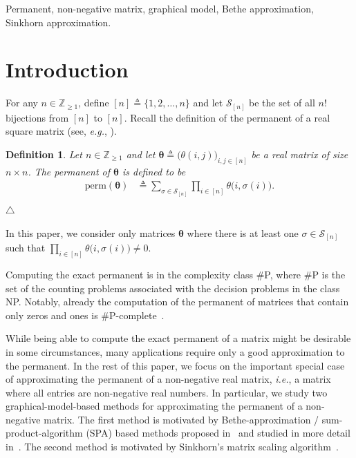 \documentclass[journal,lettersize,twocolumn]{IEEEtran} %
\newtheorem{definition}[theorem]{Definition}
\newcommand{\edefinition}{\hfill$\triangle$}
\newcommand{\set}[1]{\mathcal{#1}}
\newcommand{\sZpp}{\mathbb{Z}_{\geq 1}}
\newcommand{\matr}[1]{ \bm{#1} }
\newcommand{\defeq}{ \triangleq }
\newcommand{\perm}{ \mathrm{perm} }
\newcommand{\setS}{\set{S}}
\newcommand{\mtheta}{\matr{\theta}}
\newcommand{\eg}{\textit{e.g.}}
\newcommand{\ie}{\textit{i.e.}}
\begin{document}
%
%

\begin{IEEEkeywords}
  Permanent,
  non-negative matrix,
  graphical model,
  Bethe approximation,
  Sinkhorn approximation.
\end{IEEEkeywords}

%
%

\section{Introduction}
\label{sec:introduction:1}

%
%

For any $n \in \sZpp$, define $[n] \defeq \{ 1, 2, \ldots, n \}$ and let
$\setS_{[n]}$ be the set of all $n!$ bijections from $[n]$ to $[n]$. Recall
the definition of the permanent of a real square matrix (see, \eg,
\cite{minc_marcus_1984}).

%

\begin{definition}\label{sec:1:def:13}
	Let $n \in \sZpp$ and let
  $ \mtheta \defeq \bigl( \theta(i,j) \bigr)_{i,j\in [n]}$ be a real matrix of
  size $n \times n$. The permanent of $ \mtheta $ is defined to be
  \begin{align}
    \perm(\mtheta)
      &\defeq
         \sum_{\sigma \in \setS_{[n]}} 
           \prod_{i \in [n]}
             \theta\bigl( i, \sigma(i) \bigr).
               \label{eq:def:permanent:1} \\[-1.00cm] \nonumber
  \end{align}
  \edefinition
\end{definition}

%

In this paper, we consider only matrices $\mtheta$ where there is at least one
$\sigma \in \setS_{[n]}$ such that
$\prod_{i \in [n]} \theta\bigl( i, \sigma(i) \bigr) \neq 0$.

%
%

%

Computing the exact permanent is in the complexity class \#P, where \#P is the
set of the counting problems associated with the decision problems in the
class NP. Notably, already the computation of the permanent
of matrices that contain only zeros and ones is \#P-complete~\cite{Valiant1979}.

%

While being able to compute the exact permanent of a matrix might be desirable
in some circumstances, many applications require only a good approximation to
the permanent. In the rest of this paper, we focus on the important special
case of approximating the permanent of a non-negative real matrix, \ie, a
matrix where all entries are non-negative real numbers. In particular, we
study two graphical-model-based methods for approximating the permanent of a
non-negative matrix. The first method is motivated by Bethe-approximation /
sum-product-algorithm (SPA) based methods proposed in~\cite{Chertkov2008,
  Huang2009} and studied in more detail in~\cite{Vontobel2013a}. The second
method is motivated by Sinkhorn's matrix scaling algorithm~\cite{Linial2000}.
\end{document}
